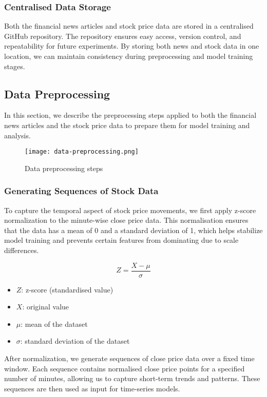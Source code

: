 \documentclass[conference]{IEEEtran}
\begin{document}
\subsubsection{Centralised Data Storage}
Both the financial news articles and stock price data are stored in a centralised GitHub repository. The repository ensures easy access, version control, and repeatability for future experiments. By storing both news and stock data in one location, we can maintain consistency during preprocessing and model training stages.

\subsection{Data Preprocessing}
In this section, we describe the preprocessing steps applied to both the financial news articles and the stock price data to prepare them for model training and analysis.

\begin{figure}
    \centering
    \texttt{[image: data-preprocessing.png]}
    \caption{Data preprocessing steps}
    \label{fig:data-preprocessing}
\end{figure}

\subsubsection{Generating Sequences of Stock Data}
To capture the temporal aspect of stock price movements, we first apply z-score normalization to the minute-wise close price data. This normalisation ensures that the data has a mean of 0 and a standard deviation of 1, which helps stabilize model training and prevents certain features from dominating due to scale differences.

\[
Z = \frac{X - \mu}{\sigma}
\]
\begin{itemize}
    \item \(Z\): z-score (standardised value)
    \item \(X\): original value
    \item \(\mu\): mean of the dataset
    \item \(\sigma\): standard deviation of the dataset
\end{itemize}

After normalization, we generate sequences of close price data over a fixed time window. Each sequence contains normalised close price points for a specified number of minutes, allowing us to capture short-term trends and patterns. These sequences are then used as input for time-series models.
\end{document}
